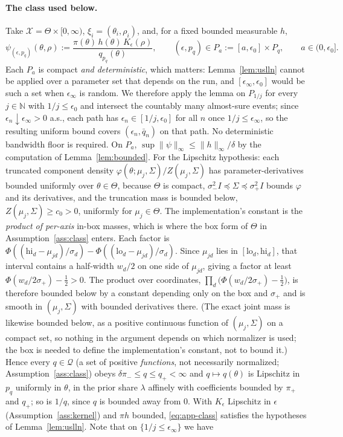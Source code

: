 \documentclass[10pt]{article}
\theoremstyle{plain}
\theoremstyle{definition}
\begin{document}
\paragraph{The class used below.} Take $\mathcal{X}=\Theta\times[0,\infty)$, $\xi_i=(\theta_i,\rho_i)$, and, for a fixed bounded measurable $h$,
\begin{equation}
\psi_{(\epsilon,p_q)}(\theta,\rho):=\frac{\pi(\theta)\,h(\theta)\,K_\epsilon(\rho)}{q_{p_q}(\theta)},
\qquad
(\epsilon,p_q)\in P_a:=[a,\epsilon_0]\times P_q,\qquad a\in(0,\epsilon_0] .
\label{eq:app-class}
\end{equation}
Each $P_a$ is compact \emph{and deterministic}, which matters: Lemma~\ref{lem:uslln} cannot be applied over a parameter set that depends on the run, and $[\epsilon_\infty,\epsilon_0]$ would be such a set when $\epsilon_\infty$ is random. We therefore apply the lemma on $P_{1/j}$ for every $j\in\mathbb{N}$ with $1/j\le\epsilon_0$ and intersect the countably many almost-sure events; since $\epsilon_n\downarrow\epsilon_\infty>0$ a.s., each path has $\epsilon_n\in[1/j,\epsilon_0]$ for all $n$ once $1/j\le\epsilon_\infty$, so the resulting uniform bound covers $(\epsilon_n,\bar q_n)$ on that path. No deterministic bandwidth floor is required. On $P_a$, $\sup\|\psi\|_\infty\le\|h\|_\infty/\delta$ by the computation of Lemma~\ref{lem:bounded}. For the Lipschitz hypothesis: each truncated component density $\varphi(\theta;\mu_j,\Sigma)/Z(\mu_j,\Sigma)$ has parameter-derivatives bounded uniformly over $\theta\in\Theta$, because $\Theta$ is compact, $\sigma_-^2I\preceq\Sigma\preceq\sigma_+^2I$ bounds $\varphi$ and its derivatives, and the truncation mass is bounded below, $Z(\mu_j,\Sigma)\ge c_0>0$, uniformly for $\mu_j\in\Theta$. The implementation's constant is the \emph{product of per-axis} in-box masses, which is where the box form of $\Theta$ in Assumption~\ref{ass:class} enters. Each factor is $\Phi((\mathrm{hi}_d-\mu_{jd})/\sigma_d)-\Phi((\mathrm{lo}_d-\mu_{jd})/\sigma_d)$. Since $\mu_{jd}$ lies in $[\mathrm{lo}_d,\mathrm{hi}_d]$, that interval contains a half-width $w_d/2$ on one side of $\mu_{jd}$, giving a factor at least $\Phi(w_d/2\sigma_+)-\tfrac12>0$. The product over coordinates, $\prod_{d}\bigl(\Phi(w_d/2\sigma_+)-\tfrac12\bigr)$, is therefore bounded below by a constant depending only on the box and $\sigma_+$ and is smooth in $(\mu_j,\Sigma)$ with bounded derivatives there. (The exact joint mass is likewise bounded below, as a positive continuous function of $(\mu_j,\Sigma)$ on a compact set, so nothing in the argument depends on which normalizer is used; the box is needed to define the implementation's constant, not to bound it.) Hence every $q\in\mathcal{Q}$ (a set of positive \emph{functions}, not necessarily normalized; Assumption~\ref{ass:class}) obeys $\delta\pi_-\le q\le q_+<\infty$ and $q\mapsto q(\theta)$ is Lipschitz in $p_q$ uniformly in $\theta$, in the prior share $\lambda$ affinely with coefficients bounded by $\pi_+$ and $q_+$; so is $1/q$, since $q$ is bounded away from $0$. With $K_\epsilon$ Lipschitz in $\epsilon$ (Assumption~\ref{ass:kernel}) and $\pi h$ bounded, \eqref{eq:app-class} satisfies the hypotheses of Lemma~\ref{lem:uslln}. Note that on $\{1/j\le\epsilon_\infty\}$ we have 
\end{document}
